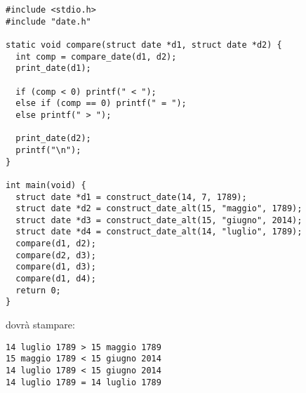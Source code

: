 \documentclass[12pt]{article}
\begin{document}
{\small
\begin{verbatim}
#include <stdio.h>
#include "date.h"

static void compare(struct date *d1, struct date *d2) {
  int comp = compare_date(d1, d2);
  print_date(d1);

  if (comp < 0) printf(" < ");
  else if (comp == 0) printf(" = ");
  else printf(" > ");

  print_date(d2);
  printf("\n");
}

int main(void) {
  struct date *d1 = construct_date(14, 7, 1789);
  struct date *d2 = construct_date_alt(15, "maggio", 1789);
  struct date *d3 = construct_date_alt(15, "giugno", 2014);
  struct date *d4 = construct_date_alt(14, "luglio", 1789);
  compare(d1, d2);
  compare(d2, d3);
  compare(d1, d3);
  compare(d1, d4);
  return 0;
}
\end{verbatim}}

\noindent
dovr\`a stampare:

{\small
\begin{verbatim}
14 luglio 1789 > 15 maggio 1789
15 maggio 1789 < 15 giugno 2014
14 luglio 1789 < 15 giugno 2014
14 luglio 1789 = 14 luglio 1789
\end{verbatim}}
\end{document}
